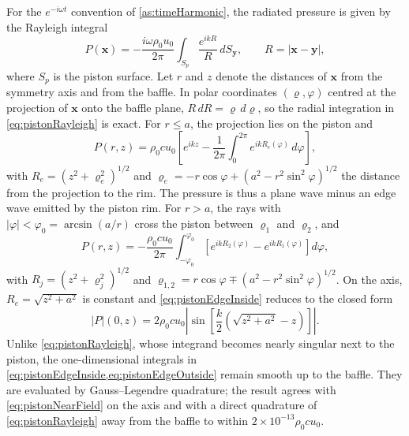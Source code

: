 \documentclass[final,12pt,nopreprintline,longtitle]{elsarticle}
\newcommand{\x}{\mathbf{x}}
\begin{document}
For the $e^{-i\omega t}$ convention of \cref{as:timeHarmonic}, the radiated
pressure is given by the Rayleigh integral \cite{morse1986theoretical}
\begin{equation}
    P(\x)
    =
    -\frac{i\omega\rho_0u_0}{2\pi}
    \int_{S_p}\frac{e^{ikR}}{R}\,dS_{\mathbf y},
    \qquad
    R=|\x-\mathbf y|,
    \label{eq:pistonRayleigh}
\end{equation}
where $S_p$ is the piston surface.  Let $r$ and $z$ denote the distances of
$\x$ from the symmetry axis and from the baffle.  In polar coordinates
$(\varrho,\varphi)$ centred at the projection of $\x$ onto the baffle plane,
$R\,dR=\varrho\,d\varrho$, so the radial integration in
\cref{eq:pistonRayleigh} is exact.  For $r\leq a$, the projection lies on the
piston and
\begin{equation}
    P(r,z)
    =
    \rho_0cu_0
    \left[
    e^{ikz}
    -\frac{1}{2\pi}\int_0^{2\pi}e^{ikR_e(\varphi)}\,d\varphi
    \right],
    \label{eq:pistonEdgeInside}
\end{equation}
with $R_e=(z^2+\varrho_e^2)^{1/2}$ and
$\varrho_e=-r\cos\varphi+(a^2-r^2\sin^2\varphi)^{1/2}$ the distance from the
projection to the rim.  The pressure is thus a plane wave minus an edge wave
emitted by the piston rim.  For $r>a$, the rays with
$|\varphi|<\varphi_0=\arcsin(a/r)$ cross the piston between $\varrho_1$ and
$\varrho_2$, and
\begin{equation}
    P(r,z)
    =
    -\frac{\rho_0cu_0}{2\pi}
    \int_{-\varphi_0}^{\varphi_0}
    \left[e^{ikR_2(\varphi)}-e^{ikR_1(\varphi)}\right]d\varphi,
    \label{eq:pistonEdgeOutside}
\end{equation}
with $R_j=(z^2+\varrho_j^2)^{1/2}$ and
$\varrho_{1,2}=r\cos\varphi\mp(a^2-r^2\sin^2\varphi)^{1/2}$.  On the axis, $R_e=\sqrt{z^2+a^2}$ is constant and \cref{eq:pistonEdgeInside}
reduces to the closed form
\begin{equation}
    |P|(0,z)
    =
    2\rho_0cu_0
    \left|
    \sin\left[
    \frac{k}{2}\left(\sqrt{z^2+a^2}-z\right)
    \right]
    \right|.
    \label{eq:pistonNearField}
\end{equation}
Unlike \cref{eq:pistonRayleigh}, whose integrand becomes nearly singular
next to the piston, the one-dimensional integrals in
\cref{eq:pistonEdgeInside,eq:pistonEdgeOutside} remain smooth up to the
baffle.  They are evaluated by Gauss--Legendre quadrature; the result agrees
with \cref{eq:pistonNearField} on the axis and with a direct quadrature of
\cref{eq:pistonRayleigh} away from the baffle to within
$2\times10^{-13}\rho_0cu_0$.
\end{document}

